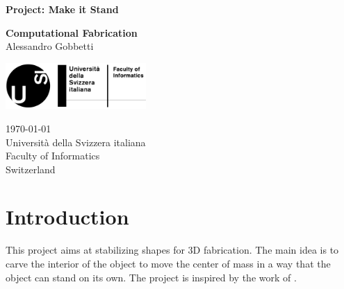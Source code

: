 \documentclass[tikz,10pt,fleqn]{article}
\newcommand\namesurname{Alessandro Gobbetti}
\newcommand\assignment{Project: Make it Stand}
\newcommand\subject{Computational Fabrication}
\newcommand\documentdate{\today}
\begin{document}
\begin{titlepage}
    \begin{center}
        \vspace*{2cm}

        \textbf{\Large{\assignment}}

        \vspace{0.5cm}
        \textbf{\subject}\\[5mm]



        \namesurname
        \vspace{1.8cm}

        { \hypersetup{hidelinks} \tableofcontents }
        \vspace*{\fill}

        \includegraphics[width=0.4\textwidth]{fig/logo}

        \documentdate \\
        Università della Svizzera italiana\\
        Faculty of Informatics\\
        Switzerland\\

    \end{center}
\end{titlepage}


\section{Introduction}
This project aims at stabilizing shapes for 3D fabrication. The main idea is to carve the interior of the object to move the center of mass in a way that the object can stand on its own. The project is inspired by the work of \cite{Pevost:2013:MIS}.
\end{document}
